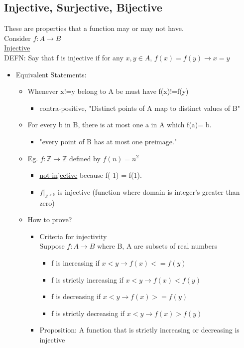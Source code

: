 \documentclass{article}
\begin{document}
\subsection{Injective, Surjective, Bijective}
These are properties that a function may or may not have.\\
Consider $f: A \rightarrow B$\\

\underline{Injective}\\

DEFN: Say that f is injective if for any $x,y \in A$, $f(x)=f(y) \rightarrow x=y$\\
\begin{itemize}
\item Equivalent Statements:
\begin{itemize}
\item Whenever x!=y belong to A be must have f(x)!=f(y)
\begin{itemize}
\item contra-positive, "Distinct points of A map to distinct values of B"
\end{itemize}
\item For every b in B, there is at most one a in A which f(a)= b.
\begin{itemize}
\item "every point of B has at most one preimage."
\end{itemize}
\item Eg. $f:\mathbb{Z} \rightarrow \mathbb{Z}$ defined by $f(n) = n^2$
\begin{itemize}
\item \underline{not injective} because f(-1) = f(1).
\item $f|_{\mathbb{Z^{> 0}}}$ is injective (function where domain is integer's greater than zero)
\end{itemize}
\item How to prove?
\begin{itemize}
\item Criteria for injectivity\\
		Suppose $f: A \rightarrow B$ where B, A are subsets of real numbers
\begin{itemize}
\item f is increasing if $x<y \rightarrow f(x) <= f(y)$
\item f is strictly increasing if $x<y \rightarrow f(x) < f(y)$
\item f is decreasing if $x<y \rightarrow f(x) >= f(y)$
\item f is strictly decreasing if $x<y \rightarrow f(x) > f(y)$
\end{itemize}
\item Proposition: A function that is strictly increasing or decreasing is injective
\end{itemize}
\end{itemize}
\end{itemize}
\end{document}
